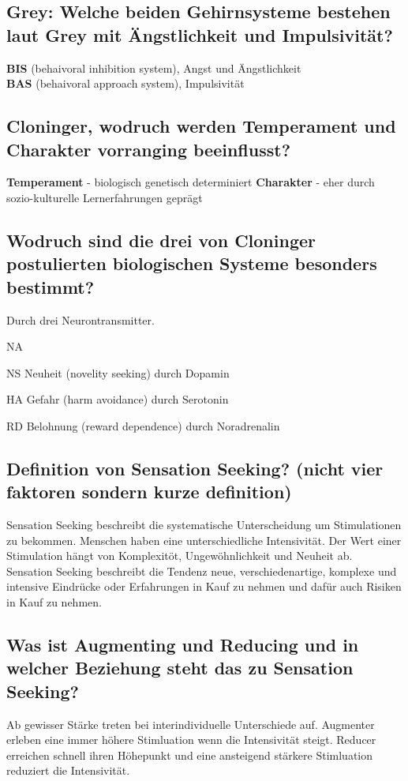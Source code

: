\documentclass[a6paper,10pt,DIV=40]{scrartcl}
\begin{document}
\subsection{Grey: Welche beiden Gehirnsysteme bestehen laut Grey mit Ängstlichkeit und Impulsivität?}
\textbf{BIS} (behaivoral inhibition system), Angst und Ängstlichkeit\\
\textbf{BAS} (behaivoral approach system), Impulsivität\\
\subsection{Cloninger, wodruch werden Temperament und Charakter vorranging beeinflusst?}
\textbf{Temperament} - biologisch genetisch determiniert
\textbf{Charakter} - eher durch sozio-kulturelle Lernerfahrungen geprägt
\subsection{Wodruch sind die drei von Cloninger postulierten biologischen Systeme besonders bestimmt?}
Durch drei Neurontransmitter.
\begin{labeling}{NA}
\item [NS] Neuheit (novelity seeking) durch Dopamin
\item [HA] Gefahr (harm avoidance) durch Serotonin
\item [RD] Belohnung (reward dependence) durch Noradrenalin
\end{labeling}
\subsection{Definition von Sensation Seeking? (nicht vier faktoren sondern kurze definition)}
Sensation Seeking beschreibt die systematische Unterscheidung um Stimulationen zu bekommen. Menschen haben eine unterschiedliche Intensivität. Der Wert einer Stimulation hängt von Komplexitöt, Ungewöhnlichkeit und Neuheit ab.\\
Sensation Seeking beschreibt die Tendenz neue, verschiedenartige, komplexe und intensive Eindrücke oder Erfahrungen in Kauf zu nehmen und dafür auch Risiken in Kauf zu nehmen.
\subsection{Was ist Augmenting und Reducing und in welcher Beziehung steht das zu Sensation Seeking?}
Ab gewisser Stärke treten bei interindividuelle Unterschiede auf. Augmenter erleben eine immer höhere Stimluation wenn die Intensivität steigt. Reducer erreichen schnell ihren Höhepunkt und eine ansteigend stärkere Stimluation reduziert die Intensivität.
\end{document}
